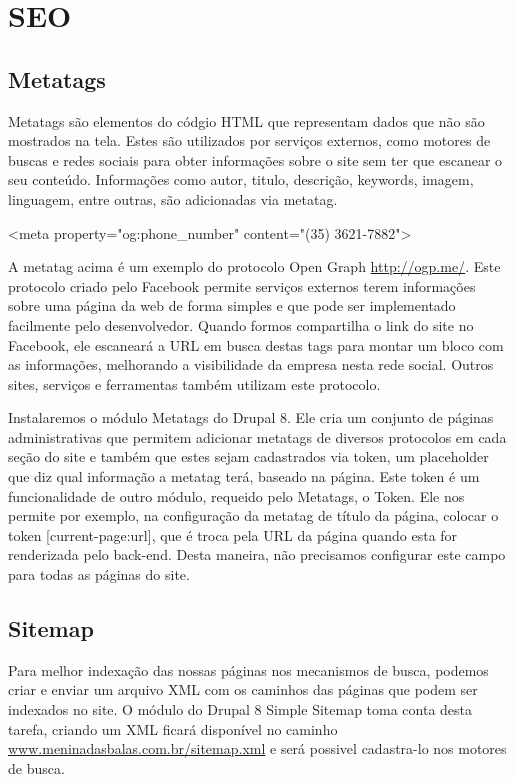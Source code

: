\section{SEO}

\subsection{Metatags}
Metatags são elementos do códgio HTML que representam dados que não são mostrados na tela. Estes são utilizados por serviços externos, como motores de buscas e redes sociais para obter informações sobre o site sem ter que escanear o seu conteúdo. Informações como autor, titulo, descrição, keywords, imagem, linguagem, entre outras, são adicionadas via metatag.

\begin{center}
  <meta property="og:phone_number" content="(35) 3621-7882">
\end{center}

A metatag acima é um exemplo do protocolo Open Graph \url{http://ogp.me/}. Este protocolo criado pelo Facebook permite serviços externos terem informações sobre uma página da web de forma simples e que pode ser implementado facilmente pelo desenvolvedor. Quando formos compartilha o link do site no Facebook, ele escaneará a URL em busca destas tags para montar um bloco com as informações, melhorando a visibilidade da empresa nesta rede social. Outros sites, serviços e ferramentas também utilizam este protocolo.

Instalaremos o módulo Metatags do Drupal 8. Ele cria um conjunto de páginas administrativas  que permitem adicionar metatags de diversos protocolos em cada seção do site e também que estes sejam cadastrados via token, um placeholder que diz qual informação a metatag terá, baseado na página. Este token é um funcionalidade de outro módulo, requeido pelo Metatags, o Token. Ele nos permite por exemplo, na configuração da metatag de título da página, colocar o token [current-page:url], que é troca pela URL da página quando esta for renderizada pelo back-end. Desta maneira, não precisamos configurar este campo para todas as páginas do site.

\subsection{Sitemap}
Para melhor indexação das nossas páginas nos mecanismos de busca, podemos criar e enviar um arquivo XML com os caminhos das páginas que podem ser indexados no site. O módulo do Drupal 8 Simple Sitemap toma conta desta tarefa, criando um XML ficará disponível no caminho \url{www.meninadasbalas.com.br/sitemap.xml} e será possivel cadastra-lo nos motores de busca.

